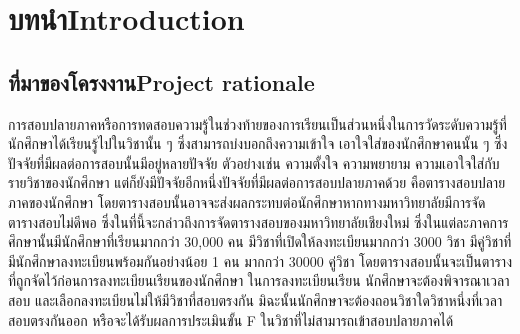 \chapter{\ifcpe บทนำ\else Introduction\fi}

\section{\ifcpe ที่มาของโครงงาน\else Project rationale\fi}
\label{sec:project_rationale}


การสอบปลายภาคหรือการทดสอบความรู้ในช่วงท้ายของการเรียนเป็นส่วนหนึ่งในการวัดระดับความรู้ที่นักศึกษาได้เรียนรู้ไปในวิชานั้น ๆ 
ซึ่งสามารถบ่งบอกถึงความเข้าใจ เอาใจใส่ของนักศึกษาคนนั้น ๆ ซึ่งปัจจัยที่มีผลต่อการสอบนั้นมีอยู่หลายปัจจัย 
ตัวอย่างเช่น ความตั้งใจ ความพยายาม ความเอาใจใส่กับรายวิชาของนักศึกษา แต่ก็ยังมีปัจจัยอีกหนึ่งปัจจัยที่มีผลต่อการสอบปลายภาคด้วย 
คือตารางสอบปลายภาคของนักศึกษา โดยตารางสอบนั้นอาจจะส่งผลกระทบต่อนักศึกษาหากทางมหาวิทยาลัยมีการจัดตารางสอบไม่ดีพอ 
ซึ่งในที่นี้จะกล่าวถึงการจัดตารางสอบของมหาวิทยาลัยเชียงใหม่ ซึ่งในแต่ละภาคการศึกษานั้นมีนักศึกษาที่เรียนมากกว่า 30,000 คน 
มีวิชาที่เปิดให้ลงทะเบียนมากกว่า 3000 วิชา มีคู่วิชาที่มีนักศึกษาลงทะเบียนพร้อมกันอย่างน้อย 1 คน มากกว่า 30000 คู่วิชา 
โดยตารางสอบนั้นจะเป็นตารางที่ถูกจัดไว้ก่อนการลงทะเบียนเรียนของนักศึกษา ในการลงทะเบียนเรียน นักศึกษาจะต้องพิจารณาเวลาสอบ และเลือกลงทะเบียนไม่ให้มีวิชาที่สอบตรงกัน 
มิฉะนั้นนักศึกษาจะต้องถอนวิชาใดวิชาหนึ่งที่เวลาสอบตรงกันออก หรือจะได้รับผลการประเมินขั้น F ในวิชาที่ไม่สามารถเข้าสอบปลายภาคได้



